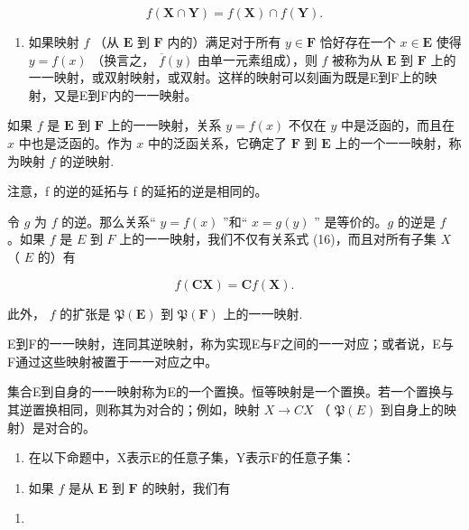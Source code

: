 \[
f (\mathbf {X} \cap \mathbf {Y}) = f (\mathbf {X}) \cap f (\mathbf {Y}).\tag{16}
\]

\begin{enumerate}
\def\labelenumi{\arabic{enumi}.}
\setcounter{enumi}{8}
\tightlist
\item
  如果映射 \(f\) （从 \(\mathbf{E}\) 到 \(\mathbf{F}\) 内的）满足对于所有 \(y \in \mathbf{F}\) 恰好存在一个 \(x \in \mathbf{E}\) 使得 \(y = f(x)\) （换言之， \(\overline{f}(y)\) 由单一元素组成），则 \(f\) 被称为从 \(\mathbf{E}\) 到 \(\mathbf{F}\) 上的一一映射，或双射映射，或双射。这样的映射可以刻画为既是E到F上的映射，又是E到F内的一一映射。
\end{enumerate}

如果 \(f\) 是 \(\mathbf{E}\) 到 \(\mathbf{F}\) 上的一一映射，关系 \(y = f(x)\) 不仅在 \(y\) 中是泛函的，而且在 \(x\) 中也是泛函的。作为 \(x\) 中的泛函关系，它确定了 \(\mathbf{F}\) 到 \(\mathbf{E}\) 上的一个一一映射，称为映射 \(f\) 的逆映射.

注意，f 的逆的延拓与 f 的延拓的逆是相同的。

令 \(g\) 为 \(f\) 的逆。那么关系“ \(y = f(x)\) ”和“ \(x = g(y)\) '' 是等价的。\(g\) 的逆是 \(f\) 。如果 \(f\) 是 \(E\) 到 \(F\) 上的一一映射，我们不仅有关系式 (16)，而且对所有子集 \(X\) （ \(E\) 的）有

\[
f (\mathbf {C X}) = \mathbf {C} f (\mathbf {X}).
\]

此外， \(f\) 的扩张是 \(\mathfrak{P}(\mathbf{E})\) 到 \(\mathfrak{P}(\mathbf{F})\) 上的一一映射.

E到F的一一映射，连同其逆映射，称为实现E与F之间的一一对应；或者说，E与F通过这些映射被置于一一对应之中。

集合E到自身的一一映射称为E的一个置换。恒等映射是一个置换。若一个置换与其逆置换相同，则称其为对合的；例如，映射 \(X \rightarrow C X\) （ \(\mathfrak{P}(E)\) 到自身上的映射）是对合的。

\begin{enumerate}
\def\labelenumi{\arabic{enumi}.}
\setcounter{enumi}{9}
\tightlist
\item
  在以下命题中，X表示E的任意子集，Y表示F的任意子集：
\end{enumerate}

\begin{enumerate}
\def\labelenumi{(\alph{enumi})}
\tightlist
\item
  如果 \(f\) 是从 \(\mathbf{E}\) 到 \(\mathbf{F}\) 的映射，我们有
\end{enumerate}

\begin{enumerate}
\def\labelenumi{(\arabic{enumi})}
\setcounter{enumi}{16}
\tightlist
\item
\end{enumerate}

